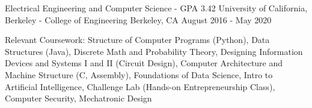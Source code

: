 

\begin{cventries}

  \cventry
    {Electrical Engineering and Computer Science - GPA 3.42} %
    {University of California, Berkeley - College of Engineering} %
    {Berkeley, CA} %
    {August 2016 - May 2020} %
    {
      \begin{cvitems} %
        \item {Relevant Coursework: Structure of Computer Programs (Python), Data Structures (Java), Discrete Math and Probability Theory, Designing Information Devices and Systems I and II (Circuit Design), Computer Architecture and Machine Structure (C, Assembly), Foundations of Data Science, Intro to Artificial Intelligence, Challenge Lab (Hands-on Entrepreneurship Class), Computer Security, Mechatronic Design}
      \end{cvitems}
    }

\end{cventries}
